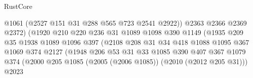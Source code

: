 \begin{lexlean}{RustCore}
\begin{coremodule}
                                            @1061
                                            (@2527 @151 @31 @288 @565 @723 @2541 @2922))
                                          @2363
                                          @2366
                                          @2369
                                          @2372)
                                        (@1920
                                          @210
                                          @220
                                          @236
                                          @31
                                          @1089
                                          @1098
                                          @390
                                          @1149
                                          (@1935
                                            @209
                                            @35
                                            @1938
                                            @1089
                                            @1096
                                            @397
                                            (@2108
                                              @208
                                              @31
                                              @34
                                              @418
                                              @1088
                                              @1095
                                              @367
                                              @1069
                                              @374
                                              @2127
                                              (@1948
                                                @206
                                                @53
                                                @31
                                                @33
                                                @1085
                                                @390
                                                @407
                                                @367
                                                @1079
                                                @374
                                                (@2000
                                                  @205
                                                  @1085
                                                  (@2005 (@2006 @1085))
                                                  (@2010 (@2012 @205 @31)))
                                                @2023

\end{coremodule}
\end{lexlean}
